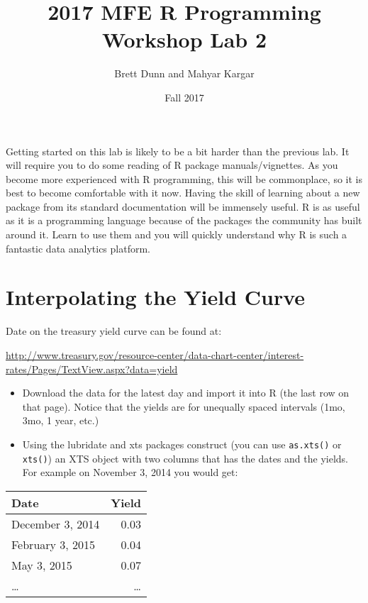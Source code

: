 \documentclass[12pt]{article}
\author{Brett Dunn and Mahyar Kargar}
\date{Fall 2017}
\title{2017 MFE R Programming Workshop Lab 2}
\begin{document}


\maketitle
\onehalfspacing
Getting started on this lab is likely to be a bit harder than the
previous lab. It will require you to do some reading of R package
manuals/vignettes. As you become more experienced with R programming,
this will be commonplace, so it is best to become comfortable with it
now. Having the skill of learning about a new package from its
standard documentation will be immensely useful. R is as useful as it
is a programming language because of the packages the community has
built around it. Learn to use them and you will quickly understand why
R is such a fantastic data analytics platform.

\section*{Interpolating the Yield Curve}
\label{sec-1}
Date on the treasury yield curve can be found at: 

\url{http://www.treasury.gov/resource-center/data-chart-center/interest-rates/Pages/TextView.aspx?data=yield}

\begin{itemize}
\item Download the data for the latest day and import it into R (the last
row on that page). Notice that the yields are for unequally spaced
intervals (1mo, 3mo, 1 year, etc.)
\item Using the lubridate and xts packages construct (you can use \verb~as.xts()~
or \verb~xts()~) an XTS object with two columns that has the dates and
the yields. For example on November 3, 2014 you would get:
\end{itemize}

\begin{center}
\begin{tabular}{lr}
Date & Yield\\
\hline
December 3, 2014 & 0.03\\
February 3, 2015 & 0.04\\
May 3, 2015 & 0.07\\
\ldots{} & \ldots{}\\
\end{tabular}
\end{center}
\end{document}
